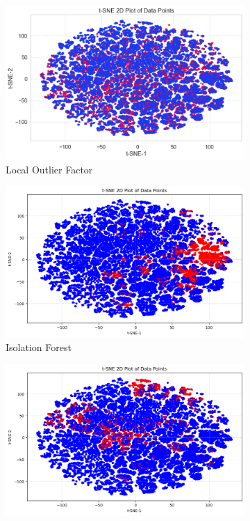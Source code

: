 \begin{figure}[htbp]
    \centering
    \begin{subfigure}{0.32\textwidth}
        \centering
        \includegraphics[width=\textwidth]{plotsss/LOF.png}
        \caption{Local Outlier Factor}
        \label{fig:LOF}
    \end{subfigure}
    \hfill
    \begin{subfigure}{0.32\textwidth}
        \centering
        \includegraphics[width=\textwidth]{plotsss/ISF.png}
        \caption{Isolation Forest}
        \label{fig:ISF}
    \end{subfigure}
    \hfill
    \begin{subfigure}{0.32\textwidth}
        \centering
        \includegraphics[width=\textwidth]{plotsss/ABOD.png}

\end{subfigure}
\end{figure}
